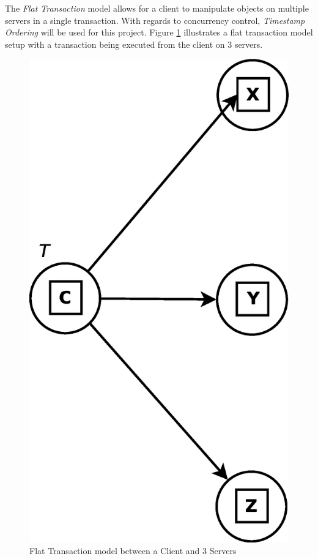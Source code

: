 \documentclass[times, 10pt,twocolumn]{article}
\begin{document}
\label{subsec:transmgt}
The {\it Flat Transaction} model allows for a client to manipulate objects on multiple servers in a single transaction. With regards to concurrency control, {\it Timestamp Ordering} will be used for this project. Figure \ref{fig:flat} illustrates a flat transaction model setup with a transaction being executed from the client on 3 servers.

\begin{figure}
\centering
\includegraphics[scale=0.2]{flat-transaction.eps}
\caption{Flat Transaction model between a Client and 3 Servers}
\label{fig:flat}
\end{figure}
\end{document}
